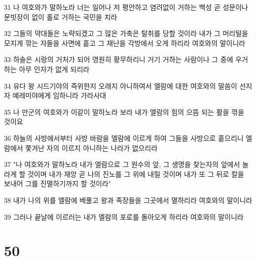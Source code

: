 \par 31 나 여호와가 말하노라 너는 일어나 저 평안하고 염려없이 거하는 백성 곧 성문이나 문빗장이 없이 홀로 거하는 국민을 치라
\par 32 그들의 약대들은 노략되겠고 그 많은 가축은 탈취를 당할 것이라 내가 그 머리털을 모지게 깎는 자들을 사면에 흩고 그 재난을 각방에서 오게 하리라 여호와의 말이니라
\par 33 하솔은 시랑의 거처가 되어 영원히 황무하리니 거기 거하는 사람이나 그 중에 우거하는 아무 인자가 없게 되리라
\par 34 유다 왕 시드기야의 즉위한지 오래지 아니하여서 엘람에 대한 여호와의 말씀이 선지자 예레미야에게 임하니라 가라사대
\par 35 나 만군의 여호와가 이같이 말하노라 보라 내가 엘람의 힘의 으뜸 되는 활을 꺾을 것이요
\par 36 하늘의 사방에서부터 사방 바람을 엘람에 이르게 하여 그들을 사방으로 흩으리니 엘람에서 쫓겨난 자의 이르지 아니하는 나라가 없으리라
\par 37 "나 여호와가 말하노라 내가 엘람으로 그 원수의 앞, 그 생명을 찾는자의 앞에서 놀라게 할 것이며 내가 재앙 곧 나의 진노를 그 위에 내릴 것이며 내가 또 그 뒤로 칼을 보내어 그를 진멸하기까지 할 것이라"
\par 38 내가 나의 위를 엘람에 베풀고 왕과 족장들을 그곳에서 멸하리라 여호와의 말이니라
\par 39 그러나 끝날에 이르러는 내가 엘람의 포로를 돌아오게 하리라 여호와의 말이니라

\chapter{50}


